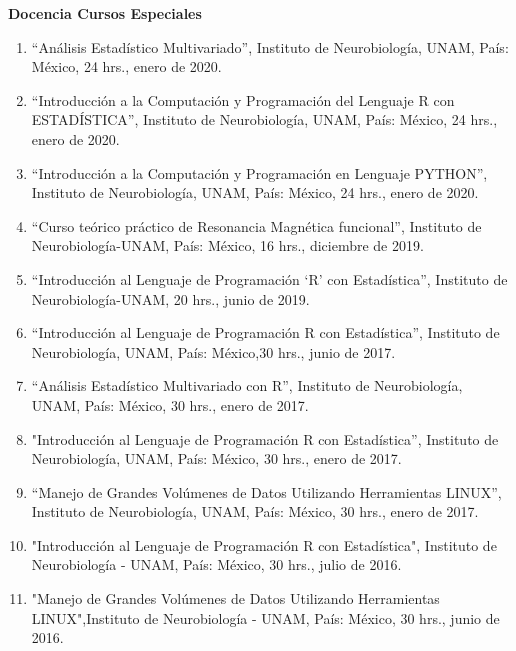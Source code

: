 \textbf{Docencia Cursos Especiales}

\hfill

\begin{enumerate}

\item “Análisis Estadístico Multivariado”, Instituto de Neurobiología, UNAM, País: México, 24 hrs., enero de 2020.

\item “Introducción a la Computación y Programación del Lenguaje R con ESTADÍSTICA”, Instituto de Neurobiología, UNAM, País: México, 24 hrs., enero de 2020.

\item “Introducción a la Computación y Programación en Lenguaje PYTHON”, Instituto de Neurobiología, UNAM, País: México, 24 hrs., enero de 2020.

\item “Curso teórico práctico de Resonancia Magnética funcional”, Instituto de Neurobiología-UNAM, País: México, 16 hrs., diciembre de 2019.

\item “Introducción al Lenguaje de Programación ‘R’ con Estadística”, Instituto de Neurobiología-UNAM, 20  hrs., junio de 2019.

\item “Introducción al Lenguaje de Programación R con Estadística”, Instituto de Neurobiología, UNAM, País: México,30 hrs.,  junio de 2017.

\item “Análisis Estadístico Multivariado con R”, Instituto de Neurobiología, UNAM, País: México, 30 hrs., enero de 
2017.

\item "Introducción al Lenguaje de Programación R con Estadística”, Instituto de Neurobiología, UNAM, País: México, 
30 hrs., enero de 2017.

\item “Manejo de Grandes Volúmenes de Datos Utilizando Herramientas LINUX”, Instituto de Neurobiología, UNAM, País: México, 30 hrs., enero de 2017.

\item "Introducción al Lenguaje de Programación R con Estadística", Instituto de Neurobiología - UNAM, País: 
México, 30 hrs., julio de 2016.

\item "Manejo de Grandes Volúmenes de Datos Utilizando Herramientas LINUX",Instituto de Neurobiología - 
UNAM, País: México, 30 hrs., junio de 2016.


\end{enumerate}
